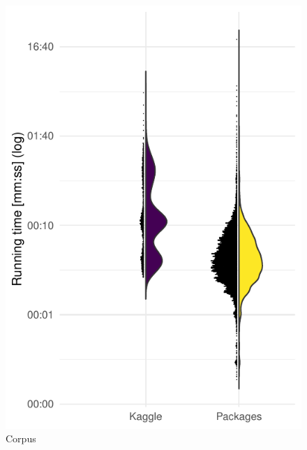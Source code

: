 \documentclass[conference]{IEEEtran}
\begin{document}
\begin{figure}[!tb]\centering\includegraphics[width=.9\linewidth]
  {programs-runtime.pdf}\caption{Corpus}\label{fig:corpus}
\end{figure}


\end{document}
